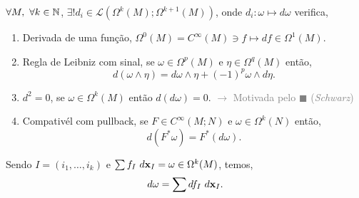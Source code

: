 \begin{theorem}
    \(\forall M, \ \forall k \in \mathbb{N}\), \(\exists !d_i \in \mathcal{L}(\Omega^k(M) ; \Omega^{k+1}(M))\), onde \(d_i: \omega \mapsto d\omega\) verifica,  
    \begin{enumerate}[label= \roman*.]
        \item Derivada de uma função, \(\Omega^0(M) = C^\infty(M) \ni f \mapsto df \in \Omega^1(M)\). 
        \item Regla de Leibniz com sinal, se \(\omega \in \Omega^p(M)\) e \(\eta\in \Omega^q(M)\) então, 
        \[ d(\omega \wedge \eta ) = d\omega \wedge \eta + (-1)^p \omega \wedge d \eta. \]
        \item \(d^2 =0\), se \(\omega \in \Omega^k(M)\) então \(d (d\omega) = 0\). \textcolor{gray}{\(\rightarrow \) Motivada pelo \(\blacksquare\) (\emph{Schwarz})}
        \item Compativél com pullback, se \(F \in C^\infty (M;N)\) e \(\omega \in \Omega^k(N)\) então, 
        \[d(F^*\omega) = F^*(d\omega).\] 
    \end{enumerate}
\end{theorem}



\begin{example}
    Sendo \(I = (i_1, \ldots, i_k)\) e \(\sum f_{I} \  d\textbf{x}_{I} = \omega \in \Omega^k(M)\), temos,     
    \begin{equation*}
        d\omega = \sum   df_I \ d\textbf{x}_I. 
    \end{equation*} 
\end{example}
%


%

